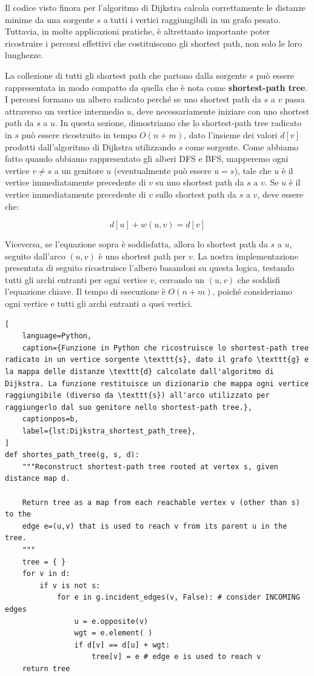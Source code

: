 \clearpage
\noindent
Il codice visto finora per l'algoritmo di Dijkstra calcola correttamente le distanze minime da una sorgente $s$ a tutti i vertici raggiungibili in un grafo pesato. Tuttavia, in molte applicazioni pratiche, è altrettanto importante poter ricostruire i percorsi effettivi che costituiscono gli shortest path, non solo le loro lunghezze. 

La collezione di tutti gli shortest path che partono dalla sorgente $s$ può essere rappresentata in modo compatto da quella che è nota come \textbf{shortest-path tree}. I percorsi formano un albero radicato perché se uno shortest path da $s$ a $v$ passa attraverso un vertice intermedio $u$, deve necessariamente iniziare con uno shortest path da $s$ a $u$.
In questa sezione, dimostriamo che lo shortest-path tree radicato in $s$ può essere ricostruito in tempo $O(n+m)$, dato l'insieme dei valori $d[v]$ prodotti dall'algoritmo di Dijkstra utilizzando $s$ come sorgente. Come abbiamo fatto quando abbiamo rappresentato gli alberi DFS e BFS, mapperemo ogni vertice $v \neq s$ a un genitore $u$ (eventualmente può essere $u = s$), tale che $u$ è il vertice immediatamente precedente di $v$ su uno shortest path da $s$ a $v$. Se $u$ è il vertice immediatamente precedente di $v$ sullo shortest path da $s$ a $v$, deve essere che:

$$ d[u] + w(u,v) = d[v] $$

\noindent
Viceversa, se l'equazione sopra è soddisfatta, allora lo shortest path da $s$ a $u$, seguito dall'arco $(u,v)$ è uno shortest path per $v$.
La nostra implementazione presentata di seguito ricostruisce l'albero basandosi su questa logica, testando tutti gli archi entranti per ogni vertice $v$, cercando un $(u,v)$ che soddisfi l'equazione chiave. Il tempo di esecuzione è $O(n+m)$, poiché consideriamo ogni vertice e tutti gli archi entranti a quei vertici.


\vspace{2\baselineskip}
\begin{lstlisting}[
    language=Python,
    caption={Funzione in Python che ricostruisce lo shortest-path tree radicato in un vertice sorgente \texttt{s}, dato il grafo \texttt{g} e la mappa delle distanze \texttt{d} calcolate dall'algoritmo di Dijkstra. La funzione restituisce un dizionario che mappa ogni vertice raggiungibile (diverso da \texttt{s}) all'arco utilizzato per raggiungerlo dal suo genitore nello shortest-path tree.},
    captionpos=b,
    label={lst:Dijkstra_shortest_path_tree},
]
def shortes_path_tree(g, s, d):
    """Reconstruct shortest-path tree rooted at vertex s, given distance map d.

    Return tree as a map from each reachable vertex v (other than s) to the
    edge e=(u,v) that is used to reach v from its parent u in the tree.
    """
    tree = { }
    for v in d:
        if v is not s:
            for e in g.incident_edges(v, False): # consider INCOMING edges
                u = e.opposite(v)
                wgt = e.element( )
                if d[v] == d[u] + wgt:
                    tree[v] = e # edge e is used to reach v
    return tree
\end{lstlisting}


